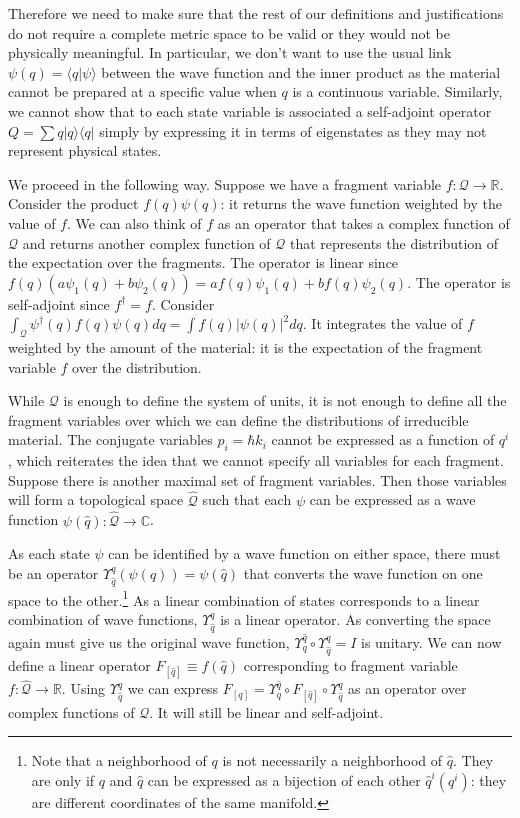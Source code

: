 \documentclass[smallextended]{svjour3}
\numberwithin{equation}{section}
\theoremstyle{definition}
\begin{document}
Therefore we need to make sure that the rest of our definitions and justifications do not require a complete metric space to be valid or they would not be physically meaningful. In particular, we don't want to use the usual link $\psi(q) = \langle q | \psi \rangle$ between the wave function and the inner product as the material cannot be prepared at a specific value when $q$ is a continuous variable. Similarly, we cannot show that to each state variable is associated a self-adjoint operator $Q = \sum q |q\rangle \langle q |$ simply by expressing it in terms of eigenstates as they may not represent physical states.

We proceed in the following way. Suppose we have a fragment variable $f : \mathcal{Q} \rightarrow \mathbb{R}$. Consider the product $f (q) \psi (q)$: it returns the wave function weighted by the value of $f$. We can also think of $f$ as an operator that takes a complex function of $\mathcal{Q}$ and returns another complex function of $\mathcal{Q}$ that represents the distribution of the expectation over the fragments. The operator is linear since $f (q) (a\psi_1(q) + b\psi_2(q)) = a f(q) \psi_1(q) + b f(q)  \psi_2(q)$. The operator is self-adjoint since $f^\dagger = f$. Consider $\int_\mathcal{Q} \psi^\dagger (q) f(q) \psi(q) dq = \int f(q) | \psi(q)|^2 dq$. It integrates the value of $f$ weighted by the amount of the material: it is the expectation of the fragment variable $f$ over the distribution. 

While $\mathcal{Q}$ is enough to define the system of units, it is not enough to define all the fragment variables over which we can define the distributions of irreducible material. The conjugate variables $p_i=\hbar k_i$ cannot be expressed as a function of $q^i$, which reiterates the idea that we cannot specify all variables for each fragment. Suppose there is another maximal set of fragment variables. Then those variables will form a topological space $\hat{\mathcal{Q}}$ such that each $\psi$ can be expressed as a wave function $\psi(\hat{q}) :\hat{\mathcal{Q}} \rightarrow \mathbb{C}$.

As each state $\psi$ can be identified by a wave function on either space, there must be an operator $\Upsilon^q_{\hat{q}}(\psi(q)) = \psi(\hat{q})$ that converts the wave function on one space to the other.\footnote{Note that a neighborhood of $q$ is not necessarily a neighborhood of $\hat{q}$. They are only if $q$ and $\hat{q}$ can be expressed as a bijection of each other $\hat{q}^i(q^i)$: they are different coordinates of the same manifold.} As a linear combination of states corresponds to a linear combination of wave functions, $\Upsilon^q_{\hat{q}}$ is a linear operator. As converting the space again must give us the original wave function, $\Upsilon^{\hat{q}}_{q} \circ \Upsilon^q_{\hat{q}}= I$ is unitary. We can now define a linear operator $F_{[\hat{q}]} \equiv f(\hat{q})$ corresponding to fragment variable $f : \hat{\mathcal{Q}} \rightarrow \mathbb{R}$. Using $\Upsilon^{q}_{\hat{q}}$ we can express $F_{[q]} = \Upsilon^{\hat{q}}_{q} \circ F_{[\hat{q}]} \circ  \Upsilon^{q}_{\hat{q}}$ as an operator over complex functions of $\mathcal{Q}$. It will still be linear and self-adjoint.
\end{document}
